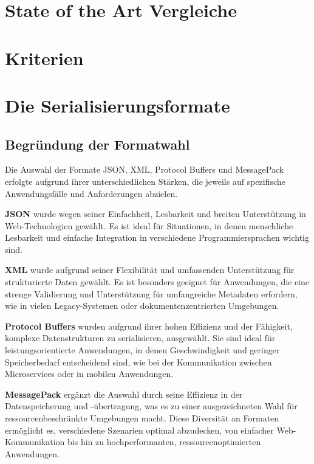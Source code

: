 \documentclass[ngerman]{seminarvorlage}
\begin{document}
\section{State of the Art Vergleiche}

\section{Kriterien}
\newpage
\section{Die Serialisierungsformate}

\subsection{Begründung der Formatwahl}

Die Auswahl der Formate JSON, XML, Protocol Buffers und MessagePack erfolgte aufgrund ihrer unterschiedlichen Stärken, die jeweils auf spezifische Anwendungsfälle und Anforderungen abzielen.

\textbf{JSON} wurde wegen seiner Einfachheit, Lesbarkeit und breiten Unterstützung in Web-Technologien gewählt. Es ist ideal für Situationen, in denen menschliche Lesbarkeit und einfache Integration in verschiedene Programmiersprachen wichtig sind.

\textbf{XML} wurde aufgrund seiner Flexibilität und umfassenden Unterstützung für strukturierte Daten gewählt. Es ist besonders geeignet für Anwendungen, die eine strenge Validierung und Unterstützung für umfangreiche Metadaten erfordern, wie in vielen Legacy-Systemen oder dokumentenzentrierten Umgebungen.

\textbf{Protocol Buffers} wurden aufgrund ihrer hohen Effizienz und der Fähigkeit, komplexe Datenstrukturen zu serialisieren, ausgewählt. Sie sind ideal für leistungsorientierte Anwendungen, in denen Geschwindigkeit und geringer Speicherbedarf entscheidend sind, wie bei der Kommunikation zwischen Microservices oder in mobilen Anwendungen.

\textbf{MessagePack} ergänzt die Auswahl durch seine Effizienz in der Datenspeicherung und -übertragung, was es zu einer ausgezeichneten Wahl für ressourcenbeschränkte Umgebungen macht. Diese Diversität an Formaten ermöglicht es, verschiedene Szenarien optimal abzudecken, von einfacher Web-Kommunikation bis hin zu hochperformanten, ressourcenoptimierten Anwendungen.
\newpage 
\end{document}
